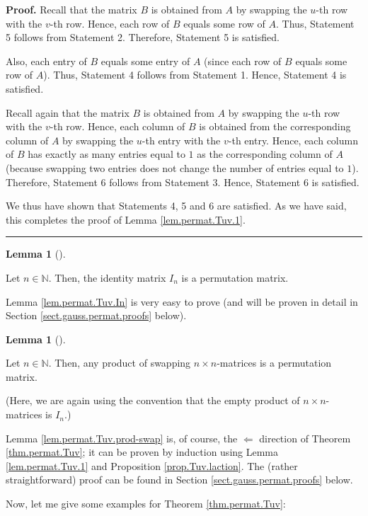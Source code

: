 \documentclass[numbers=enddot,12pt,final,onecolumn,notitlepage]{scrartcl}%
\theoremstyle{definition}
\newtheorem{lem}[theo]{Lemma}
\newenvironment{lemma}[1][]
{\begin{lem}[#1]\begin{leftbar}}
{\end{leftbar}\end{lem}}
\newenvironment{proof}[1][Proof]{\noindent\textbf{#1.} }{\ \rule{0.5em}{0.5em}}
\begin{document}
\begin{proof}
Recall that the matrix $B$ is obtained from $A$ by swapping the $u$-th row
with the $v$-th row. Hence, each row of $B$ equals some row of $A$. Thus,
Statement 5 follows from Statement 2. Therefore, Statement 5 is satisfied.

Also, each entry of $B$ equals some entry of $A$ (since each row of $B$ equals
some row of $A$). Thus, Statement 4 follows from Statement 1. Hence, Statement
4 is satisfied.

Recall again that the matrix $B$ is obtained from $A$ by swapping the $u$-th
row with the $v$-th row. Hence, each column of $B$ is obtained from the
corresponding column of $A$ by swapping the $u$-th entry with the $v$-th
entry. Hence, each column of $B$ has exactly as many entries equal to $1$ as
the corresponding column of $A$ (because swapping two entries does not change
the number of entries equal to $1$). Therefore, Statement 6 follows from
Statement 3. Hence, Statement 6 is satisfied.

We thus have shown that Statements 4, 5 and 6 are satisfied. As we have said,
this completes the proof of Lemma \ref{lem.permat.Tuv.1}.
\end{proof}

\begin{lemma}
\label{lem.permat.Tuv.In}Let $n\in\mathbb{N}$. Then, the identity matrix
$I_{n}$ is a permutation matrix.
\end{lemma}

Lemma \ref{lem.permat.Tuv.In} is very easy to prove (and will be proven in
detail in Section \ref{sect.gauss.permat.proofs} below).

\begin{lemma}
\label{lem.permat.Tuv.prod-swap}Let $n\in\mathbb{N}$. Then, any product of
swapping $n\times n$-matrices is a permutation matrix.

(Here, we are again using the convention that the empty product of $n\times
n$-matrices is $I_{n}$.)
\end{lemma}

Lemma \ref{lem.permat.Tuv.prod-swap} is, of course, the $\Longleftarrow$
direction of Theorem \ref{thm.permat.Tuv}; it can be proven by induction using
Lemma \ref{lem.permat.Tuv.1} and Proposition \ref{prop.Tuv.laction}. The
(rather straightforward) proof can be found in Section
\ref{sect.gauss.permat.proofs} below.

Now, let me give some examples for Theorem \ref{thm.permat.Tuv}:
\end{document}
